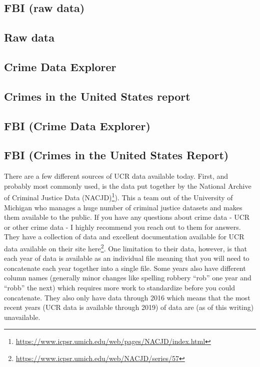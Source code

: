 \documentclass[
]{krantz}
\renewcommand{\href}[2]{#2\footnote{\url{#1}}}
\begin{document}
\subsection{FBI (raw data)}\label{fbi-raw-data}

\subsection{Raw data}\label{raw-data}

\subsection{Crime Data Explorer}\label{crime-data-explorer}

\subsection{Crimes in the United States
report}\label{crimes-in-the-united-states-report}

\subsection{FBI (Crime Data
Explorer)}\label{fbi-crime-data-explorer}

\subsection{FBI (Crimes in the United States
Report)}\label{fbi-crimes-in-the-united-states-report}

There are a few different sources of UCR data available
today. First, and probably most commonly used, is the data
put together by the
\href{https://www.icpsr.umich.edu/web/pages/NACJD/index.html}{National
Archive of Criminal Justice Data (NACJD)}). This a team out
of the University of Michigan who manages a huge number of
criminal justice datasets and makes them available to the
public. If you have any questions about crime data - UCR or
other crime data - I highly recommend you reach out to them
for answers. They have a collection of data and excellent
documentation available for UCR data available on their site
\href{https://www.icpsr.umich.edu/web/NACJD/series/57}{here}.
One limitation to their data, however, is that each year of
data is available as an individual file meaning that you
will need to concatenate each year together into a single
file. Some years also have different column names (generally
minor changes like spelling robbery ``rob'' one year and
``robb'' the next) which requires more work to standardize
before you could concatenate. They also only have data
through 2016 which means that the most recent years (UCR
data is available through 2019) of data are (as of this
writing) unavailable.
\end{document}
